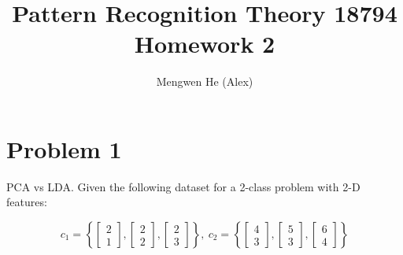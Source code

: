 \documentclass[letterpaper,10pt]{article}
\title{\textbf{Pattern Recognition Theory 18794 Homework 2}}
\author{Mengwen He (Alex)}
\begin{document}
\maketitle

\section*{Problem 1}

PCA vs LDA. Given the following dataset for a 2-class problem with 2-D features:

\begin{equation}
\nonumber
c_1=\left\{\left[\begin{array}{c}
2 \\ 1
\end{array}\right],\left[\begin{array}{c}
2 \\ 2
\end{array}\right],\left[\begin{array}{c}
2 \\ 3
\end{array}\right]\right\},~
c_2=\left\{\left[\begin{array}{c}
4 \\ 3
\end{array}\right],\left[\begin{array}{c}
5 \\ 3
\end{array}\right],\left[\begin{array}{c}
6 \\ 4
\end{array}\right]\right\}
\end{equation}
\end{document}
